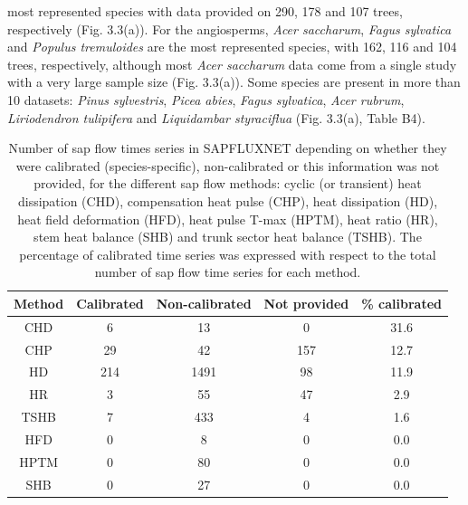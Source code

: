 \documentclass[11pt,twoside]{reedthesis}
\begin{document}
most represented species with data provided on 290, 178 and 107 trees,
respectively (Fig. 3.3(a)). For the angiosperms, \emph{Acer saccharum},
\emph{Fagus sylvatica} and \emph{Populus tremuloides} are the most
represented species, with 162, 116 and 104 trees, respectively, although
most \emph{Acer saccharum} data come from a single study with a very
large sample size (Fig. 3.3(a)). Some species are present in more than
10 datasets: \emph{Pinus sylvestris}, \emph{Picea abies}, \emph{Fagus
sylvatica}, \emph{Acer rubrum}, \emph{Liriodendron tulipifera} and
\emph{Liquidambar styraciflua} (Fig. 3.3(a), Table B4).\par
\begin{table}[!h]

\caption[Number of sap flow times series in SAPFLUXNET depending on whether they were calibrated for the different sap flow methods.]{\label{tab:Ch3T1}Number of sap flow times series in SAPFLUXNET depending on whether they were calibrated (species-specific), non-calibrated or this information was not provided, for the different sap flow methods: cyclic (or transient) heat dissipation (CHD), compensation heat pulse (CHP), heat dissipation (HD), heat field deformation (HFD), heat pulse T-max (HPTM), heat ratio (HR), stem heat balance (SHB) and trunk sector heat balance (TSHB). The percentage of calibrated time series was expressed with respect to the total number of sap flow time series for each method.}
\centering
\fontsize{10}{12}\selectfont
\begin{tabular}[t]{ccccc}
\toprule
Method & Calibrated & Non-calibrated & Not provided & \% calibrated\\
\midrule
CHD & 6 & 13 & 0 & 31.6\\
CHP & 29 & 42 & 157 & 12.7\\
HD & 214 & 1491 & 98 & 11.9\\
HR & 3 & 55 & 47 & 2.9\\
TSHB & 7 & 433 & 4 & 1.6\\
HFD & 0 & 8 & 0 & 0.0\\
HPTM & 0 & 80 & 0 & 0.0\\
SHB & 0 & 27 & 0 & 0.0\\
\bottomrule
\end{tabular}
\end{table}
\end{document}

